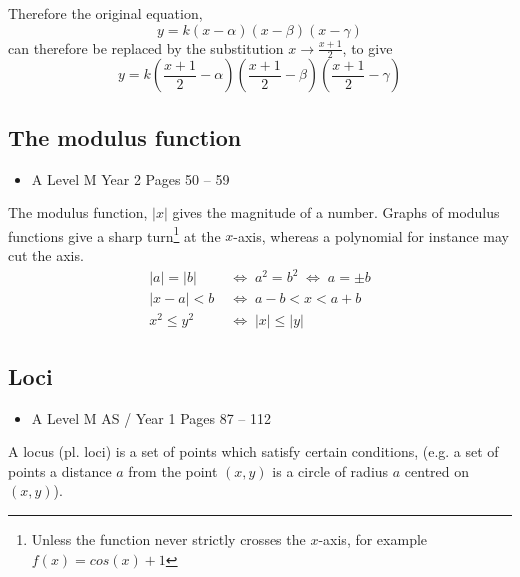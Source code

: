 \documentclass[11pt, a4paper]{article}
\begin{document}
Therefore the original equation, 
\begin{equation*}
y=k(x-\alpha)(x-\beta)(x-\gamma)
\end{equation*}
can therefore be replaced by the substitution $x\rightarrow\frac{x+1}{2}$, to give
\begin{equation*}
y=k\left(\frac{x+1}{2}-\alpha\right)\left(\frac{x+1}{2}-\beta\right)\left(\frac{x+1}{2}-\gamma\right)
\end{equation*}
\vspace{-0.4cm}


\subsection{The modulus function}
\begin{itemize}
\item A Level M Year 2 \hspace{1cm} \phantom{ AS / } Pages 50 -- 59
\end{itemize} \par
The modulus function, $|x|$ gives the magnitude of a number. Graphs of modulus functions give a sharp turn\footnote{Unless the function never strictly crosses the $x$-axis, for example $f(x)=cos(x)+1$} at the $x$-axis, whereas a polynomial for instance may cut the axis. 
\vspace{-0.25cm}
\begin{align*}
|a|=|b| \;&\Longleftrightarrow\; a^{2}=b^{2} \;\Longleftrightarrow\; a=\pm b  \\
|x-a|<b \;&\Longleftrightarrow\; a-b<x<a+b  \\
x^{2} \leq y^{2} \;&\Longleftrightarrow\; |x|\leq |y| 
\end{align*}


\subsection{Loci}
\label{loci}
\begin{itemize}
\item A Level M AS / Year 1 \hspace{1cm} \phantom{ } Pages 87 -- 112
\end{itemize} \par
A locus (pl. loci) is a set of points which satisfy certain conditions, (e.g. a set of points a distance $a$ from the point $(x,y)$ is a circle of radius $a$ centred on $(x,y)$).
\vspace{0.5cm}
\end{document}
